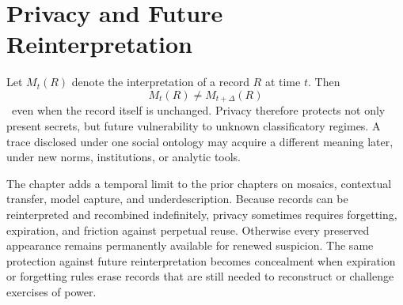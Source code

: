 
\chapter{Privacy and Future Reinterpretation}
\label{ch:ch034}

Let \(M_t(R)\) denote the interpretation of a record \(R\) at time \(t\). Then
\[
M_t(R) \neq M_{t+\Delta}(R)
\]
\ProposedTheorem\ even when the record itself is unchanged. Privacy therefore protects not only present secrets, but future vulnerability to unknown classificatory regimes. A trace disclosed under one social ontology may acquire a different meaning later, under new norms, institutions, or analytic tools.

The chapter adds a temporal limit to the prior chapters on mosaics, contextual transfer, model capture, and underdescription. Because records can be reinterpreted and recombined indefinitely, privacy sometimes requires forgetting, expiration, and friction against perpetual reuse. Otherwise every preserved appearance remains permanently available for renewed suspicion. The same protection against future reinterpretation becomes concealment when expiration or forgetting rules erase records that are still needed to reconstruct or challenge exercises of power.
